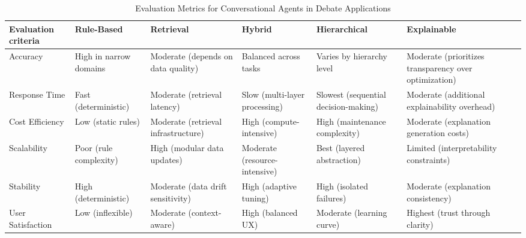 \documentclass[conference]{IEEEtran}
\begin{document}
\begin{table}[h]
    \centering
    \caption{Evaluation Metrics for Conversational Agents in Debate Applications}
    \label{tab:ai_models}
    \begin{tabular}{|>{\centering\arraybackslash}p{1.1cm}|>{\centering\arraybackslash}p{1.2cm}|>{\centering\arraybackslash}p{1.2cm}|>{\centering\arraybackslash}p{1.3cm}|>{\centering\arraybackslash}p{1.4cm}|>{\centering\arraybackslash}p{1.5cm}|}
    \hline
    \textbf{Evaluation criteria}  & \textbf{Rule-Based}                 & \textbf{Retrieval}                            & \textbf{Hybrid}\cite{b19}             & \textbf{Hierarchical} \cite{b18}                & \textbf{Explainable} \cite{b14} \cite{b17} \\ \hline
    Accuracy                      & High in narrow domains \cite{b14}   & Moderate (depends on data quality) \cite{b15} & Balanced across tasks                 & Varies by hierarchy level                 & Moderate (prioritizes transparency over optimization) \\ \hline
    Response Time \cite{b16}      & Fast (deterministic)                & Moderate (retrieval latency)                  & Slow (multi-layer processing)         & Slowest (sequential decision-making)      & Moderate (additional explainability overhead) \\ \hline
    Cost Efficiency               & Low (static rules)                  & Moderate (retrieval infrastructure)           & High (compute-intensive)              & High (maintenance complexity)             & Moderate (explanation generation costs) \\ \hline
    Scalability                   & Poor (rule complexity)              & High (modular data updates)                   & Moderate (resource-intensive)         & Best (layered abstraction)                & Limited (interpretability constraints) \\ \hline
    Stability                     & High (deterministic)                & Moderate (data drift sensitivity)             & High (adaptive tuning)                & High (isolated failures)                  & Moderate (explanation consistency) \\ \hline
    User Satisfaction             & Low (inflexible)                    & Moderate (context-aware)                      & High (balanced UX)                    & Moderate (learning curve)                 & Highest (trust through clarity) \\ \hline
    \end{tabular}
\end{table}
\end{document}
